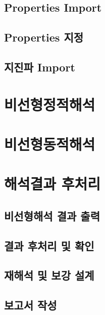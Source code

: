 \documentclass[a4paper,11pt,korean,openany,oneside]{sphinxmanual}
\begin{document}
\section{Properties Import}
\label{\detokenize{3_import_properties:properties-import}}\label{\detokenize{3_import_properties::doc}}
\sphinxstepscope


\section{Properties 지정}
\label{\detokenize{3_assign_properties:properties}}\label{\detokenize{3_assign_properties::doc}}
\sphinxstepscope


\section{지진파 Import}
\label{\detokenize{3_import_seismic_waves:import}}\label{\detokenize{3_import_seismic_waves::doc}}
\sphinxstepscope


\chapter{비선형정적해석}
\label{\detokenize{4_nonlinear_static_analysis:id1}}\label{\detokenize{4_nonlinear_static_analysis::doc}}
\sphinxstepscope


\chapter{비선형동적해석}
\label{\detokenize{5_nonlinear_dynamic_analysis:id1}}\label{\detokenize{5_nonlinear_dynamic_analysis::doc}}
\sphinxstepscope


\chapter{해석결과 후처리}
\label{\detokenize{6_post-processing:id1}}\label{\detokenize{6_post-processing::doc}}

\section{비선형해석 결과 출력}
\label{\detokenize{6_post-processing:id2}}

\section{결과 후처리 및 확인}
\label{\detokenize{6_post-processing:id3}}

\section{재해석 및 보강 설계}
\label{\detokenize{6_post-processing:id4}}

\section{보고서 작성}
\label{\detokenize{6_post-processing:id5}}


\renewcommand{\indexname}{색인}
\printindex
\end{document}
